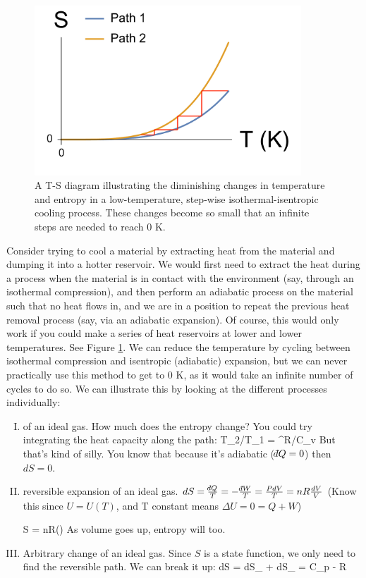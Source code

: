 \documentclass[12pt]{article}
\def\dbar{{\mathchar'26\mkern-12mu d}}
\begin{document}
\begin{figure}[h]
\centering
\includegraphics[width = 10cm]{Can_We_achieve_0K.pdf}
\caption{A T-S diagram illustrating the diminishing changes in temperature and entropy in a low-temperature, step-wise isothermal-isentropic cooling process. These changes become so small that an infinite steps are needed to reach 0 K.}
\label{Can_We_Reach_0_K}
\end{figure}

Consider trying to cool a material by extracting heat from the material and dumping it into a hotter reservoir. %
We would first need to extract the heat during a process when the material is in contact with the environment (say, through an isothermal compression), and then perform an adiabatic process on the material such that no heat flows in, and we are in a position to repeat the previous heat removal process (say, via an adiabatic expansion).  Of course, this would only work if you could make a series of heat reservoirs at lower and lower temperatures. See Figure \ref{Can_We_Reach_0_K}.  We can reduce the temperature by cycling between isothermal compression and isentropic (adiabatic) expansion, but we can never practically use this method to get to 0 K, as it would take an infinite number of cycles to do so. We can illustrate this by looking at the different processes individually:
\begin{enumerate}[(I)]
\item {} of an ideal gas.  How much does the entropy change? You could try integrating the heat capacity along the path:
\beq T_2/T_1 = ^{R/C_v} \ceq
But that's kind of silly. You know that because it's adiabatic ($\dbar Q = 0$) then $d S = 0$.
\item {} reversible expansion of an ideal gas.  $dS = \frac{\dbar Q}{T} = -\frac{\dbar W}{T} = \frac{PdV}{T} = nR \frac{dV}{V}$ (Know this since $U=U(T)$, and T constant means $\Delta U = 0 = Q + W$)

\beq 
\Delta S = nR\ln\Big(\Big) 
\ceq
As volume goes up, entropy will too.
\item Arbitrary change of an ideal gas.  Since $S$ is a state function, we only need to find the reversible path.  We can break it up:
\beq dS = dS_ + dS_ = C_p  - R \ceq

\end{enumerate}
\end{document}
